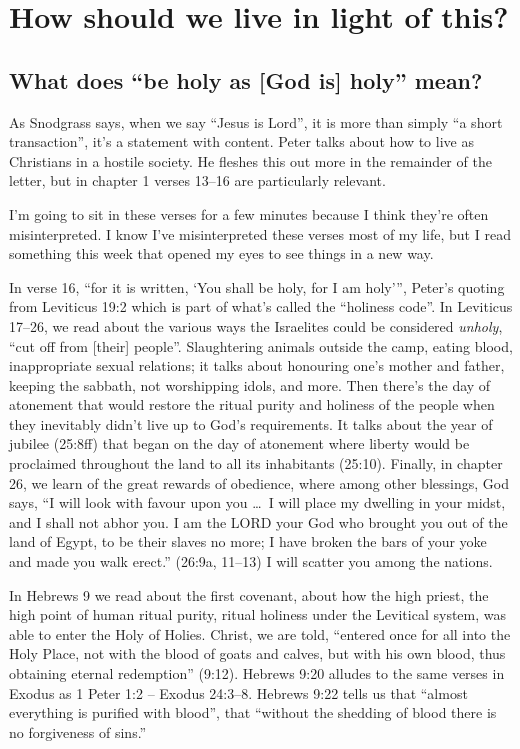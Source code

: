 \section{How should we live in light of this?}

\subsection{What does \enquote{be holy as [God is] holy} mean?}

As Snodgrass says, when we say \enquote{Jesus is Lord}, it is more than simply
\enquote{a short transaction}, it's a statement with content. Peter talks about
how to live as Christians in a hostile society. He fleshes this out more in the
remainder of the letter, but in chapter 1 verses 13--16 are particularly
relevant.

I'm going to sit in these verses for a few minutes because I think they're often
misinterpreted. I know I've misinterpreted these verses most of my life, but I
read something this week that opened my eyes to see things in a new way.

In verse 16, \enquote{for it is written, \enquote{You shall be holy, for I am
holy}}, Peter's quoting from Leviticus 19:2 which is part of what's called the
\enquote{holiness code}. In Leviticus 17--26, we read about the various ways the
Israelites could be considered \textit{unholy}, \enquote{cut off from [their]
people}. Slaughtering animals outside the camp, eating blood, inappropriate
sexual relations; it talks about honouring one's mother and father, keeping the
sabbath, not worshipping idols, and more. Then there's the day of atonement that
would restore the ritual purity and holiness of the people when they inevitably
didn't live up to God's requirements. It talks about the year of jubilee
(25:8ff) that began on the day of atonement where liberty would be proclaimed
throughout the land to all its inhabitants (25:10). Finally, in chapter 26, we
learn of the great rewards of obedience, where among other blessings, God says,
\enquote{I will look with favour upon you \dots\ I will place my dwelling in
your midst, and I shall not abhor you. I am the LORD your God who brought you
out of the land of Egypt, to be their slaves no more; I have broken the bars of
your yoke and made you walk erect.} (26:9a, 11--13) I will scatter you among the
nations.

In Hebrews 9 we read about the first covenant, about how the high priest, the
high point of human ritual purity, ritual holiness under the Levitical system,
was able to enter the Holy of Holies. Christ, we are told, \enquote{entered once
for all into the Holy Place, not with the blood of goats and calves, but with
his own blood, thus obtaining eternal redemption} (9:12). Hebrews 9:20 alludes
to the same verses in Exodus as 1 Peter 1:2 -- Exodus 24:3--8. Hebrews 9:22
tells us that \enquote{almost everything is purified with blood}, that
\enquote{without the shedding of blood there is no forgiveness of sins.}


